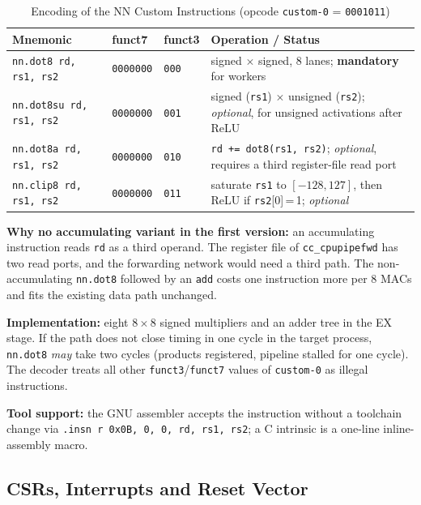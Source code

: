 \begin{table}[H]
\caption{Encoding of the NN Custom Instructions (opcode \texttt{custom-0} = \texttt{0001011})}
\label{tab:mcnndot8enc}
\centering
{\footnotesize
\begin{tabularx}{\textwidth}{|l |l |l |X|}
  \hline
  Mnemonic & funct7 & funct3 & Operation / Status \\
  \hline
  \hline
  \texttt{nn.dot8 rd, rs1, rs2}  & \texttt{0000000} & \texttt{000} &
    signed $\times$ signed, 8 lanes; \textbf{mandatory} for workers \\
  \hline
  \texttt{nn.dot8su rd, rs1, rs2} & \texttt{0000000} & \texttt{001} &
    signed (\texttt{rs1}) $\times$ unsigned (\texttt{rs2}); \textit{optional},
    for unsigned activations after ReLU \\
  \hline
  \texttt{nn.dot8a rd, rs1, rs2} & \texttt{0000000} & \texttt{010} &
    \texttt{rd += dot8(rs1, rs2)}; \textit{optional}, requires a third
    register-file read port \\
  \hline
  \texttt{nn.clip8 rd, rs1, rs2} & \texttt{0000000} & \texttt{011} &
    saturate \texttt{rs1} to $[-128, 127]$, then ReLU if \texttt{rs2}[0]\,=\,1;
    \textit{optional} \\
  \hline
\end{tabularx}}
\end{table}

\textbf{Why no accumulating variant in the first version:} an accumulating
instruction reads \texttt{rd} as a third operand. The register file of
\texttt{cc\_cpupipefwd} has two read ports, and the forwarding network would
need a third path. The non-accumulating \texttt{nn.dot8} followed by an
\texttt{add} costs one instruction more per 8 MACs and fits the existing
data path unchanged.

\textbf{Implementation:} eight $8\times8$ signed multipliers and an adder
tree in the EX stage. If the path does not close timing in one cycle in the
target process, \texttt{nn.dot8} \textit{may} take two cycles (products
registered, pipeline stalled for one cycle). The decoder treats all other
\texttt{funct3}/\texttt{funct7} values of \texttt{custom-0} as illegal
instructions.

\textbf{Tool support:} the GNU assembler accepts the instruction without a
toolchain change via
\texttt{.insn r 0x0B, 0, 0, rd, rs1, rs2}; a C intrinsic is a one-line
inline-assembly macro.

\subsection{CSRs, Interrupts and Reset Vector}
\label{subsec:mcnncsr}

